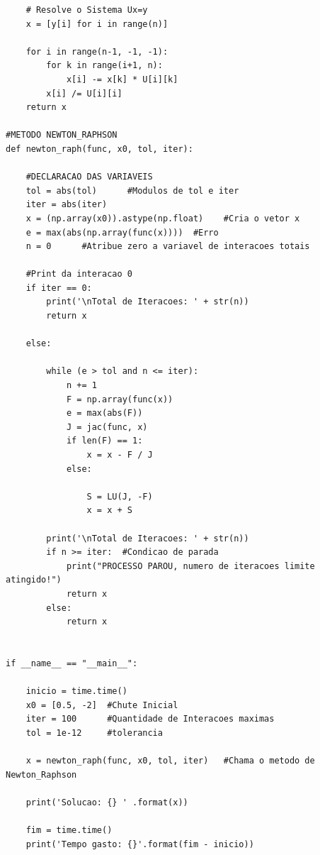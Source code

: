 \documentclass[a4paper, 12pt, openright, oneside]{article}
\begin{document}
\begin{lstlisting}
    # Resolve o Sistema Ux=y
    x = [y[i] for i in range(n)]

    for i in range(n-1, -1, -1):
        for k in range(i+1, n):
            x[i] -= x[k] * U[i][k]
        x[i] /= U[i][i]
    return x

#METODO NEWTON_RAPHSON
def newton_raph(func, x0, tol, iter):

    #DECLARACAO DAS VARIAVEIS
    tol = abs(tol)      #Modulos de tol e iter
    iter = abs(iter)
    x = (np.array(x0)).astype(np.float)    #Cria o vetor x
    e = max(abs(np.array(func(x))))  #Erro
    n = 0      #Atribue zero a variavel de interacoes totais

    #Print da interacao 0
    if iter == 0:
        print('\nTotal de Iteracoes: ' + str(n))
        return x

    else:

        while (e > tol and n <= iter):
            n += 1
            F = np.array(func(x))
            e = max(abs(F))
            J = jac(func, x)
            if len(F) == 1:
                x = x - F / J
            else:

                S = LU(J, -F)
                x = x + S

        print('\nTotal de Iteracoes: ' + str(n))
        if n >= iter:  #Condicao de parada
            print("PROCESSO PAROU, numero de iteracoes limite atingido!")
            return x
        else:
            return x


if __name__ == "__main__":

    inicio = time.time()
    x0 = [0.5, -2]  #Chute Inicial
    iter = 100      #Quantidade de Interacoes maximas
    tol = 1e-12     #tolerancia

    x = newton_raph(func, x0, tol, iter)   #Chama o metodo de Newton_Raphson

    print('Solucao: {} ' .format(x))

    fim = time.time()
    print('Tempo gasto: {}'.format(fim - inicio))
\end{lstlisting}
\end{document}
